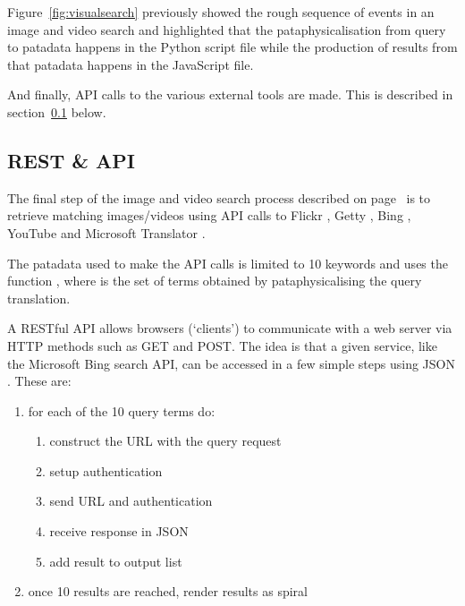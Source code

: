 Figure~\ref{fig:visualsearch} previously showed the rough sequence of events in an image and video search and highlighted that the pataphysicalisation from query to patadata happens in the  Python script file while the production of results from that patadata happens in the  JavaScript file.

And finally, \ac{API} calls to the various external tools are made. This is described in section~\ref{s:api} below.


\subsection{REST \& API}
\label{s:api}

The final step of the image and video search process described on page~\pageref{s:imgvid} is to retrieve matching images/videos using \ac{API} calls to Flickr \autocite{FlickrAPI,FlickrGuideAPI}, Getty \autocite{GettyAPI,GettyOverviewAPI}, Bing \autocite{BingAPI,BingAzureAPI}, YouTube \autocite{YouTubeAPI} and Microsoft Translator \autocite{TranslatorAPI}.

The patadata used to make the \ac{API} calls is limited to 10 keywords and uses the function , where  is the set of terms obtained by pataphysicalising the query translation.

A \acs{REST}ful \ac{API} allows browsers (`clients') to communicate with a web server via \acs{HTTP} methods such as GET and POST. The idea is that a given service, like the Microsoft Bing search \ac{API}, can be accessed in a few simple steps using  \ac{JSON} \autocite{JSON2016}. These are:

\begin{enumerate}
  \item for each of the 10 query terms do:
  \begin{enumerate}
    \item construct the \ac{URL} with the query request
    \item setup authentication
    \item send \ac{URL} and authentication
    \item receive response in \ac{JSON}
    \item add result to output list 
  \end{enumerate}
  \item once 10 results are reached, render results as spiral
\end{enumerate}

